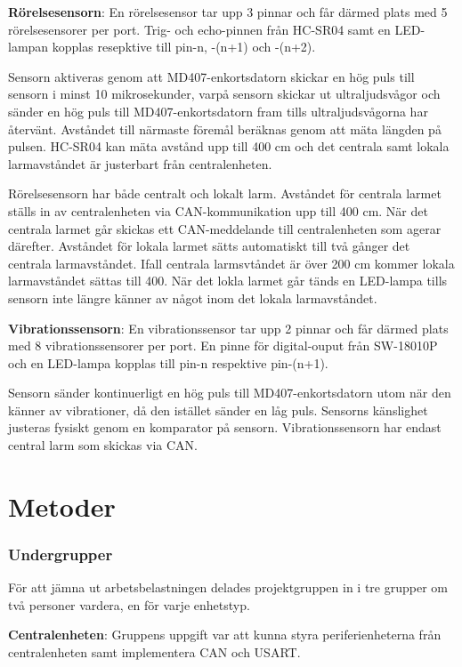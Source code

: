 \documentclass{article}
\begin{document}
\textbf{Rörelsesensorn}:
En rörelsesensor tar upp 3 pinnar och får därmed plats med 5 rörelsesensorer per port.
Trig- och echo-pinnen från HC-SR04 samt en LED-lampan kopplas resepktive till  pin-n, -(n+1) och -(n+2).


Sensorn aktiveras genom att MD407-enkortsdatorn skickar en hög puls till sensorn i minst 10 mikrosekunder, 
varpå sensorn skickar ut ultraljudsvågor och sänder en hög puls till MD407-enkortsdatorn fram tills 
ultraljudsvågorna har återvänt. Avståndet till närmaste föremål beräknas genom att mäta längden på pulsen.
HC-SR04 kan mäta avstånd upp till 400 cm och det centrala samt lokala larmavståndet är justerbart från centralenheten.

Rörelsesensorn har både centralt och lokalt larm. Avståndet för centrala larmet ställs in av centralenheten via CAN-kommunikation 
upp till 400 cm. När det centrala larmet går skickas ett CAN-meddelande till centralenheten som agerar därefter. 
Avståndet för lokala larmet sätts automatiskt till två gånger det centrala larmavståndet. Ifall centrala larmsvtåndet är över 200 cm kommer 
lokala larmavståndet sättas till 400. När det lokla larmet går tänds en LED-lampa tills sensorn inte längre känner av något inom 
det lokala larmavståndet.

\textbf{Vibrationssensorn}:
En vibrationssensor tar upp 2 pinnar och får därmed plats med 8 vibrationssensorer per port. 
En pinne för digital-ouput från SW-18010P och en LED-lampa kopplas till pin-n respektive pin-(n+1).

Sensorn sänder kontinuerligt en hög puls till MD407-enkortsdatorn utom när den
känner av vibrationer, då den istället sänder en låg puls. Sensorns känslighet justeras fysiskt genom en komparator på sensorn. 
Vibrationssensorn har endast central larm som skickas via CAN.



\section{Metoder}

\subsubsection{Undergrupper}
För att jämna ut arbetsbelastningen delades projektgruppen in i tre grupper om två personer vardera,
en för varje enhetstyp.

\textbf{Centralenheten}: Gruppens uppgift var att kunna styra
periferienheterna från centralenheten samt implementera CAN och USART.
\end{document}
